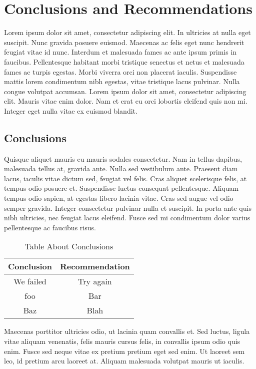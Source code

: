 \documentclass[letterpaper]{kuthesis}
\begin{document}
\chapter{Conclusions and Recommendations}
Lorem ipsum dolor sit amet, consectetur adipiscing elit. In ultricies at nulla eget suscipit. Nunc gravida posuere euismod. Maecenas ac felis eget nunc hendrerit feugiat vitae id nunc. Interdum et malesuada fames ac ante ipsum primis in faucibus. Pellentesque habitant morbi tristique senectus et netus et malesuada fames ac turpis egestas. Morbi viverra orci non placerat iaculis. Suspendisse mattis lorem condimentum nibh egestas, vitae tristique lacus pulvinar. Nulla congue volutpat accumsan. Lorem ipsum dolor sit amet, consectetur adipiscing elit. Mauris vitae enim dolor. Nam et erat eu orci lobortis eleifend quis non mi. Integer eget nulla vitae ex euismod blandit.
\section{Conclusions}
Quisque aliquet mauris eu mauris sodales consectetur. Nam in tellus dapibus, malesuada tellus at, gravida ante. Nulla sed vestibulum ante. Praesent diam lacus, iaculis vitae dictum sed, feugiat vel felis. Cras aliquet scelerisque felis, at tempus odio posuere et. Suspendisse luctus consequat pellentesque. Aliquam tempus odio sapien, at egestas libero lacinia vitae. Cras sed augue vel odio semper gravida. Integer consectetur pulvinar nulla et suscipit. In porta ante quis nibh ultricies, nec feugiat lacus eleifend. Fusce sed mi condimentum dolor varius pellentesque ac faucibus risus.
\begin{table}[h!]
\centering
\caption{Table About Conclusions}
\begin{tabular}{|c | c|} 
 \hline
 Conclusion & Recommendation\\ 
 \hline
 We failed & Try again \\
 \hline
 foo & Bar \\
 \hline
 Baz & Blah\\
 \hline
\end{tabular}
\label{table:1}
\end{table}
\par \bigskip
Maecenas porttitor ultricies odio, ut lacinia quam convallis et. Sed luctus, ligula vitae aliquam venenatis, felis mauris cursus felis, in convallis ipsum odio quis enim. Fusce sed neque vitae ex pretium pretium eget sed enim. Ut laoreet sem leo, id pretium arcu laoreet at. Aliquam malesuada volutpat mauris ut iaculis. 
\end{document}
